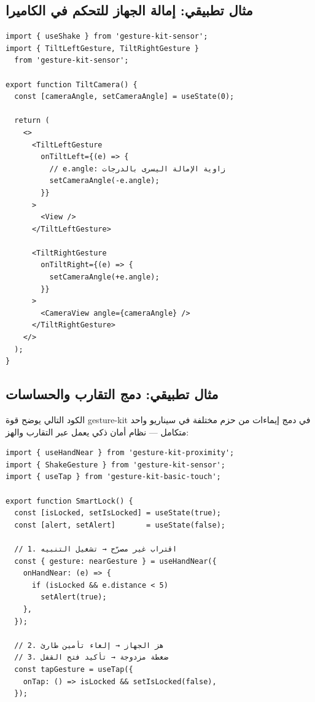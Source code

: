 \begin{Arabic}
\subsection{مثال تطبيقي: إمالة الجهاز للتحكم في الكاميرا}

\begin{english}
\begin{verbatim}
import { useShake } from 'gesture-kit-sensor';
import { TiltLeftGesture, TiltRightGesture }
  from 'gesture-kit-sensor';

export function TiltCamera() {
  const [cameraAngle, setCameraAngle] = useState(0);

  return (
    <>
      <TiltLeftGesture
        onTiltLeft={(e) => {
          // e.angle: زاوية الإمالة اليسرى بالدرجات
          setCameraAngle(-e.angle);
        }}
      >
        <View />
      </TiltLeftGesture>

      <TiltRightGesture
        onTiltRight={(e) => {
          setCameraAngle(+e.angle);
        }}
      >
        <CameraView angle={cameraAngle} />
      </TiltRightGesture>
    </>
  );
}
\end{verbatim}
\end{english}

\subsection{مثال تطبيقي: دمج التقارب والحساسات}

الكود التالي يوضح قوة \textenglish{gesture-kit} في دمج إيماءات من حزم مختلفة في سيناريو واحد متكامل — نظام أمان ذكي يعمل عبر التقارب والهز:

\begin{english}
\begin{verbatim}
import { useHandNear } from 'gesture-kit-proximity';
import { ShakeGesture } from 'gesture-kit-sensor';
import { useTap } from 'gesture-kit-basic-touch';

export function SmartLock() {
  const [isLocked, setIsLocked] = useState(true);
  const [alert, setAlert]       = useState(false);

  // 1. اقتراب غير مصرّح → تشغيل التنبيه
  const { gesture: nearGesture } = useHandNear({
    onHandNear: (e) => {
      if (isLocked && e.distance < 5)
        setAlert(true);
    },
  });

  // 2. هز الجهاز → إلغاء تأمين طارئ
  // 3. ضغطة مزدوجة → تأكيد فتح القفل
  const tapGesture = useTap({
    onTap: () => isLocked && setIsLocked(false),
  });


\end{verbatim}
\end{english}
\end{Arabic}
